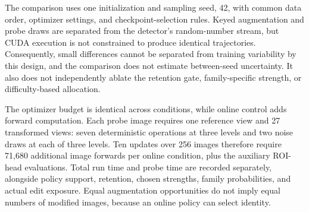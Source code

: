 \documentclass[conference]{IEEEtran}
\begin{document}
The comparison uses one initialization and sampling seed, 42, with common data order, optimizer settings, and checkpoint-selection rules. Keyed augmentation and probe draws are separated from the detector's random-number stream, but CUDA execution is not constrained to produce identical trajectories. Consequently, small differences cannot be separated from training variability by this design, and the comparison does not estimate between-seed uncertainty. It also does not independently ablate the retention gate, family-specific strength, or difficulty-based allocation.

The optimizer budget is identical across conditions, while online control adds forward computation. Each probe image requires one reference view and 27 transformed views: seven deterministic operations at three levels and two noise draws at each of three levels. Ten updates over 256 images therefore require 71,680 additional image forwards per online condition, plus the auxiliary ROI-head evaluations. Total run time and probe time are recorded separately, alongside policy support, retention, chosen strengths, family probabilities, and actual edit exposure. Equal augmentation opportunities do not imply equal numbers of modified images, because an online policy can select identity.



\end{document}
